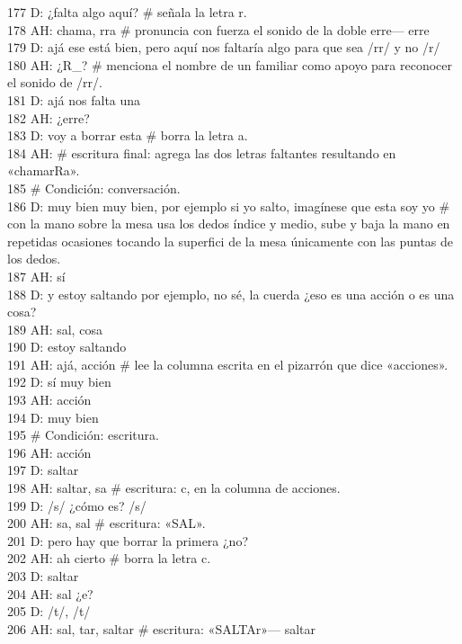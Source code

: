 177 D: ¿falta algo aquí? \# señala la letra r.\\
178 AH: chama, rra \# pronuncia con fuerza el sonido de la doble erre--- erre\\
179 D: ajá ese está bien, pero aquí nos faltaría algo para que sea /rr/ y no /r/\\
180 AH: ¿R\_? \# menciona el nombre de un familiar como apoyo para reconocer el sonido de /rr/.\\
181 D: ajá nos falta una\\
182 AH: ¿erre?\\
183 D: voy a borrar esta \# borra la letra a.\\
184 AH: \# escritura final: agrega las dos letras faltantes resultando en «chamarRa».\\
185 \# Condición: conversación.\\
186 D: muy bien muy bien, por ejemplo si yo salto, imagínese que esta soy yo \# con la mano sobre la mesa usa los dedos índice y medio, sube y baja la mano en repetidas ocasiones tocando la superfici de la mesa únicamente con las puntas de los dedos.\\
187 AH: sí\\
188 D: y estoy saltando por ejemplo, no sé, la cuerda ¿eso es una acción o es una cosa?\\
189 AH: sal, cosa\\
190 D: estoy saltando\\
191 AH: ajá, acción \# lee la columna escrita en el pizarrón que dice «acciones».\\
192 D: sí muy bien\\
193 AH: acción\\
194 D: muy bien\\
195 \# Condición: escritura.\\
196 AH: acción\\
197 D: saltar\\
198 AH: saltar, sa \# escritura: c, en la columna de acciones.\\
199 D: /s/ ¿cómo es? /s/\\
200 AH: sa, sal \# escritura: «SAL».\\
201 D: pero hay que borrar la primera ¿no?\\
202 AH: ah cierto \# borra la letra c.\\
203 D: saltar\\
204 AH: sal ¿e?\\
205 D: /t/, /t/\\
206 AH: sal, tar, saltar \# escritura: «SALTAr»--- saltar\\
